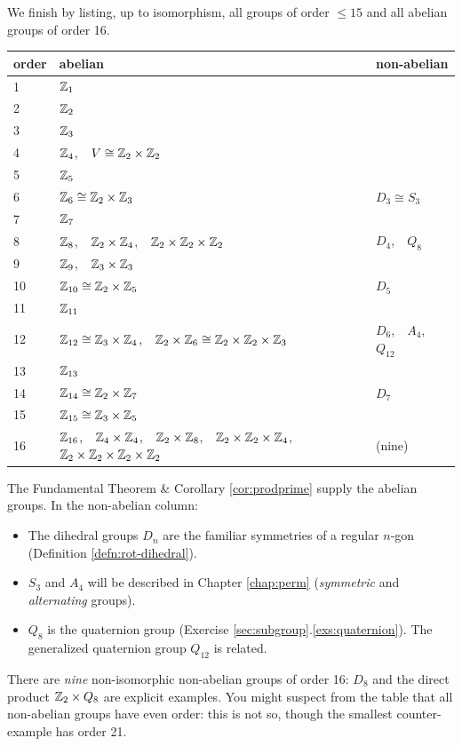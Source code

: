 We finish by listing, up to isomorphism, all groups of order $\le 15$ and all abelian groups of order 16.
\begin{center}\label{pg:fundabel}
	\begin{tabular}{|l|l|l|}
		\hline
		order & abelian & non-abelian\\
		\hline
		1 & $\mathbb{Z}_1$ & \\
		2 & $\mathbb{Z}_2$ & \\
		3 & $\mathbb{Z}_3$ & \\
		4 & $\mathbb{Z}_4$,\ \ $V\cong\mathbb{Z}_2\times\mathbb{Z}_2$ & \\
		\hline
		5 & $\mathbb{Z}_5$ & \\
		6 & $\mathbb{Z}_6\cong\mathbb{Z}_2\times\mathbb{Z}_3$ & $D_3\cong S_3$\\
		7 & $\mathbb{Z}_7$ & \\
		8 & $\mathbb{Z}_8$,\ \ $\mathbb{Z}_2\times\mathbb{Z}_4$,\ \ $\mathbb{Z}_2\times\mathbb{Z}_2\times\mathbb{Z}_2$ & $D_4$,\ \ $Q_8$\\
		\hline
		9 & $\mathbb{Z}_9$,\ \ $\mathbb{Z}_3\times\mathbb{Z}_3$ & \\
		10 & $\mathbb{Z}_{10}\cong\mathbb{Z}_2\times\mathbb{Z}_5$ & $D_5$\\
		11 & $\mathbb{Z}_{11}$ & \\
		12 & $\mathbb{Z}_{12}\cong\mathbb{Z}_3\times\mathbb{Z}_4$,\ \ $\mathbb{Z}_2\times\mathbb{Z}_6\cong\mathbb{Z}_2\times\mathbb{Z}_2\times\mathbb{Z}_3$ & $D_6$,\ \ $A_4$,\ \ $Q_{12}$\\
		\hline
		13 & $\mathbb{Z}_{13}$ & \\
		14 & $\mathbb{Z}_{14}\cong\mathbb{Z}_2\times\mathbb{Z}_7$ & $D_7$\\
		15 & $\mathbb{Z}_{15}\cong\mathbb{Z}_3\times\mathbb{Z}_5$ & \\
		16 & $\mathbb{Z}_{16}$,\ \ $\mathbb{Z}_4\times\mathbb{Z}_4$,\ \ $\mathbb{Z}_2\times\mathbb{Z}_8$,\ \ $\mathbb{Z}_2\times\mathbb{Z}_2\times\mathbb{Z}_4$,\ \ $\mathbb{Z}_2\times\mathbb{Z}_2\times\mathbb{Z}_2\times\mathbb{Z}_2$ & (nine)\\
		\hline
	\end{tabular}
\end{center}

The Fundamental Theorem \& Corollary \ref{cor:prodprime} supply the abelian groups. In the non-abelian column:
\begin{itemize}\itemsep0pt
  \item The dihedral groups $D_n$ are the familiar symmetries of a regular $n$-gon (Definition \ref{defn:rot-dihedral}).
  \item $S_3$ and $A_4$ will be described in Chapter \ref{chap:perm} (\emph{symmetric} and \emph{alternating} groups).
  \item $Q_8$ is the quaternion group (Exercise \ref*{sec:subgroup}.\ref{exs:quaternion}). The generalized quaternion group $Q_{12}$ is related.
\end{itemize}
There are \emph{nine} non-isomorphic non-abelian groups of order 16: $D_8$ and the direct product $\mathbb{Z}_2\times Q_8$ are explicit examples. You might suspect from the table that all non-abelian groups have even order: this is not so, though the smallest counter-example has order 21.


